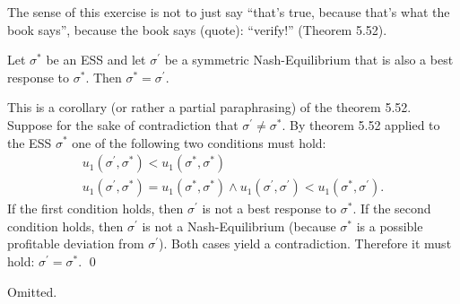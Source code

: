 \documentclass{scrartcl}
\begin{document}
 The sense of this exercise is not to
just say ``that's true, because that's what the book says'',
because the book says (quote): ``verify!'' (Theorem 5.52).

\vspace{1em}

 Let $\sigma^\ast$ be an ESS and let 
$\sigma^\prime$ be a symmetric Nash-Equilibrium that is 
also a best response to $\sigma^\ast$.
Then $\sigma^\ast = \sigma^\prime$.

 This is a corollary (or rather a 
partial paraphrasing) of the theorem 5.52.
Suppose for the sake of contradiction that 
$\sigma^\prime\neq \sigma^\ast$.
By theorem 5.52 applied to the ESS $\sigma^\ast$ one 
of the following two conditions must hold:
\begin{align*}
  u_1(\sigma^\prime, \sigma^\ast) < 
  u_1(\sigma^\ast, \sigma^\ast) \\
  u_1(\sigma^\prime, \sigma^\ast) = 
  u_1(\sigma^\ast, \sigma^\ast) \wedge
  u_1(\sigma^\prime, \sigma^\prime) <
  u_1(\sigma^\ast, \sigma^\prime).
\end{align*}
If the first condition holds, then $\sigma^\prime$ is not 
a best response to $\sigma^\ast$. 
If the second condition holds, then $\sigma^\prime$ is not
a Nash-Equilibrium (because $\sigma^\ast$ is a possible 
profitable deviation from $\sigma^\prime$).
Both cases yield a contradiction. Therefore it must hold:
$\sigma^\prime = \sigma^\ast$. \hfill \qed

\vspace{1em}

 Omitted. 
\end{document}
